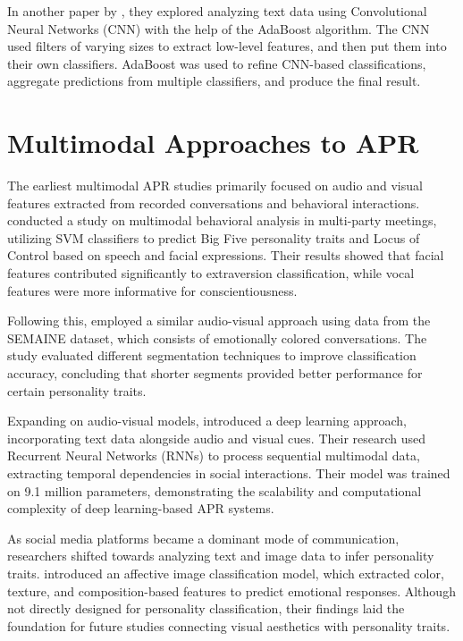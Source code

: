 In another paper by \citet{Deilami2022}, they explored analyzing text data using Convolutional Neural Networks (CNN) with the help of the AdaBoost algorithm. The CNN used filters of varying sizes to extract low-level features, and then put them into their own classifiers. AdaBoost was used to refine CNN-based classifications, aggregate predictions from multiple classifiers, and produce the final result.

\section{Multimodal Approaches to APR}
\label{sec: MMApproaches}
The earliest multimodal APR studies primarily focused on audio and visual features extracted from recorded conversations and behavioral interactions. \citet{Pianesi2008} conducted a study on multimodal behavioral analysis in multi-party meetings, utilizing SVM classifiers to predict Big Five personality traits and Locus of Control based on speech and facial expressions. Their results showed that facial features contributed significantly to extraversion classification, while vocal features were more informative for conscientiousness.

Following this, \citet{Sidorov2014} employed a similar audio-visual approach using data from the SEMAINE dataset, which consists of emotionally colored conversations. The study evaluated different segmentation techniques to improve classification accuracy, concluding that shorter segments provided better performance for certain personality traits.

Expanding on audio-visual models, \citet{Lima2022} introduced a deep learning approach, incorporating text data alongside audio and visual cues. Their research used Recurrent Neural Networks (RNNs) to process sequential multimodal data, extracting temporal dependencies in social interactions. Their model was trained on 9.1 million parameters, demonstrating the scalability and computational complexity of deep learning-based APR systems.

As social media platforms became a dominant mode of communication, researchers shifted towards analyzing text and image data to infer personality traits. \citet{Machajdik2010} introduced an affective image classification model, which extracted color, texture, and composition-based features to predict emotional responses. Although not directly designed for personality classification, their findings laid the foundation for future studies connecting visual aesthetics with personality traits.

